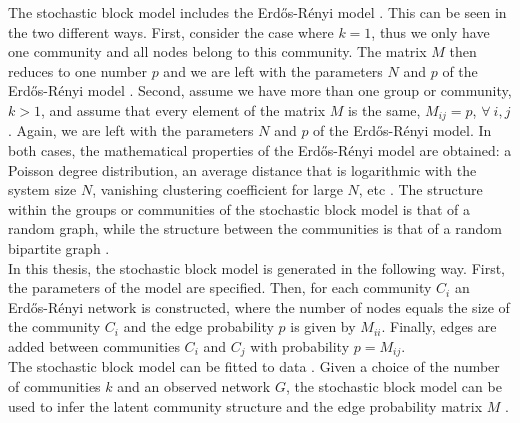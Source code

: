 \documentclass[11 pt , letterpaper , twoside , openright]{book}
\begin{document}
The stochastic block model includes the Erd\H{o}s-R\'{e}nyi model \cite{Clauset2017}. This can be seen in the two different ways. First, consider the case where $k = 1$, thus we only have one community and all nodes belong to this community. The matrix $M$ then reduces to one number $p$ and we are left with the parameters $N$ and $p$ of the Erd\H{o}s-R\'{e}nyi model \cite{Clauset2017}. Second, assume we have more than one group or community, $k > 1$, and assume that every element of the matrix $M$ is the same, $M_{ij} = p$, $\forall \ i, j$ \cite{Clauset2017}. Again, we are left with the parameters $N$ and $p$ of the Erd\H{o}s-R\'{e}nyi model. In both cases, the mathematical properties of the Erd\H{o}s-R\'{e}nyi model are obtained: a Poisson degree distribution, an average distance that is logarithmic with the system size $N$, vanishing clustering coefficient for large $N$, etc \cite{Clauset2017}. The structure within the groups or communities of the stochastic block model is that of a random graph, while the structure between the communities is that of a random bipartite graph \cite{Clauset2017}.\\
In this thesis, the stochastic block model is generated in the following way. First, the parameters of the model are specified. Then, for each community $C_i$ an Erd\H{o}s-R\'{e}nyi network is constructed, where the number of nodes equals the size of the community $C_i$ and the edge probability $p$ is given by $M_{ii}$. Finally, edges are added between communities $C_i$ and $C_j$ with probability $p = M_{ij}$.\\
\newline
The stochastic block model can be fitted to data \cite{Clauset2017}. Given a choice of the number of communities $k$ and an observed network $G$, the stochastic block model can be used to infer the latent community structure and the edge probability matrix $M$ \cite{Clauset2017}.\\
\end{document}

